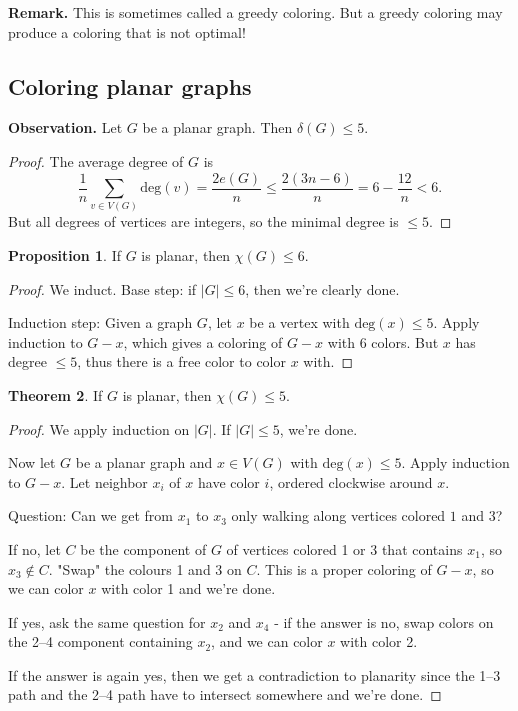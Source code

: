 \documentclass{article}
\theoremstyle{definition}
\newtheorem{theorem}{Theorem}[section]
\newtheorem{prop}[theorem]{Proposition}
\begin{document}
\textbf{Remark.} This is sometimes called a greedy coloring. But a greedy coloring may produce a coloring that is not optimal!

\subsection{Coloring planar graphs}
\textbf{Observation.} Let $G$ be a planar graph. Then $\delta(G)\le 5$.
\begin{proof}
    The average degree of $G$ is $$\frac{1}{n}\sum_{v \in V(G)}^{} \text{deg}(v) = \frac{2e(G)}{n} \le \frac{2(3n-6)}{n} = 6 - \frac{12}{n} < 6.$$
    But all degrees of vertices are integers, so the minimal degree is $\le 5$.
\end{proof}
\begin{prop}
    If $G$ is planar, then $\chi(G)\le 6$.
\end{prop}
\begin{proof}
    We induct. Base step: if $|G| \le 6$, then we're clearly done.
    \vspace{1mm}
    
    Induction step: Given a graph $G$, let $x$ be a vertex with $\text{deg}(x)\le 5$. Apply induction to $G-x$, which gives a coloring of $G-x$ with 6 colors. But $x$ has degree $\le 5$, thus there is a free color to color $x$ with.
\end{proof}


\begin{theorem}
    If $G$ is planar, then $\chi(G) \le 5$. 
\end{theorem}
\begin{proof}
    We apply induction on $|G|$. If $|G|\le 5$, we're done.
    
    Now let $G$ be a planar graph  and $x \in V(G)$ with $\text{deg}(x)\le 5$. Apply induction to $G-x$. Let neighbor $x_i$ of $x$ have color $i$, ordered clockwise around $x$. 
    \vspace{1mm}
    
    Question: Can we get from $x_1$ to $x_3$ only walking along vertices colored $1$ and $3$?

    If no, let $C$ be the component of $G$ of vertices colored 1 or 3 that contains $x_1$, so $x_3 \not\in C$. "Swap" the colours 1 and 3 on $C$. This is a proper coloring of $G-x$, so we can color $x$ with color 1 and we're done.
    
    If yes, ask the same question for $x_2$ and $x_4$ - if the answer is no, swap colors on the 2--4 component containing $x_2$, and we can color $x$ with color 2.

    If the answer is again yes, then we get a contradiction to planarity since the 1--3 path and the 2--4 path have to intersect somewhere and we're done.
\end{proof}
\end{document}
